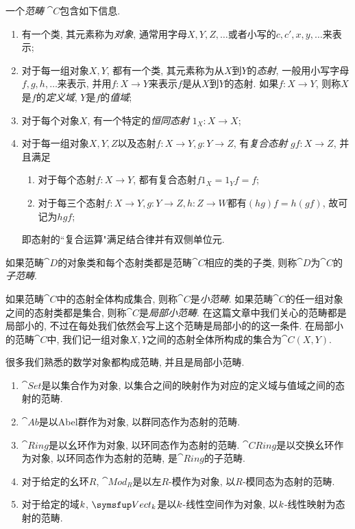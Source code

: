 一个\emph{范畴} $\cat{C}$包含如下信息.
\begin{enumerate}
  \item 有一个类, 其元素称为\emph{对象}, 通常用字母$X, Y, Z, \dotsc$或者小写的$c, c', x, y, \dotsc$来表示;
  \item 对于每一组对象$X, Y$, 都有一个类, 其元素称为从$X$到$Y$的\emph{态射}, 一般用小写字母$f, g, h, \dotsc$来表示, 并用$f\colon X\to Y$来表示$f$是从$X$到$Y$的态射. 如果$f\colon X\to Y$, 则称$X$是$f$的\emph{定义域}, $Y$是$f$的\emph{值域};
  \item 对于每个对象$X$, 有一个特定的\emph{恒同态射} $1_X\colon X\to X$;
  \item 对于每一组对象$X, Y, Z$以及态射$f\colon X\to Y, g\colon Y\to Z$, 有\emph{复合态射} $gf\colon X\to Z$, 并且满足
  \begin{enumerate}
    \item 对于每个态射$f\colon X\to Y$, 都有复合态射$f1_{X}=1_{Y}f=f$;
    \item 对于每三个态射$f\colon X\to Y, g\colon Y\to Z, h\colon Z\to W$都有$(hg)f=h(gf)$, 故可记为$hgf$;
  \end{enumerate}
  即态射的``复合运算"满足结合律并有双侧单位元.
\end{enumerate}

如果范畴$\cat{D} $的对象类和每个态射类都是范畴$\cat{C}$相应的类的子类, 则称$\cat{D}$为$\cat{C}$的\emph{子范畴}.

如果范畴$\cat{C}$中的态射全体构成集合, 则称$\cat{C}$是\emph{小范畴}. 如果范畴$\cat{C}$的任一组对象之间的态射类都是集合, 则称$\cat{C}$是\emph{局部小范畴}. 在这篇文章中我们关心的范畴都是局部小的, 不过在每处我们依然会写上这个范畴是局部小的的这一条件. 在局部小的范畴$\cat{C}$中, 我们记一组对象$X, Y$之间的态射全体所构成的集合为$\cat{C} (X, Y)$.

\begin{example}
  很多我们熟悉的数学对象都构成范畴, 并且是局部小范畴.
  \begin{enumerate}\label{exm:concretecategory}
    \item $\cat{Set}$是以集合作为对象, 以集合之间的映射作为对应的定义域与值域之间的态射的范畴.
    \item $\cat{Ab}$是以Abel群作为对象, 以群同态作为态射的范畴.
    \item $\cat{Ring}$是以幺环作为对象, 以环同态作为态射的范畴. $\cat{CRing}$是以交换幺环作为对象, 以环同态作为态射的范畴, 是$\cat{Ring}$的子范畴.
    \item 对于给定的幺环$R$, $\cat{Mod}_R$是以左$R$-模作为对象, 以$R$-模同态为态射的范畴.
    \item 对于给定的域$k$, $\cat{Vect}_{\kk}$是以$k$-线性空间作为对象, 以$k$-线性映射为态射的范畴.
  \end{enumerate}
\end{example}

